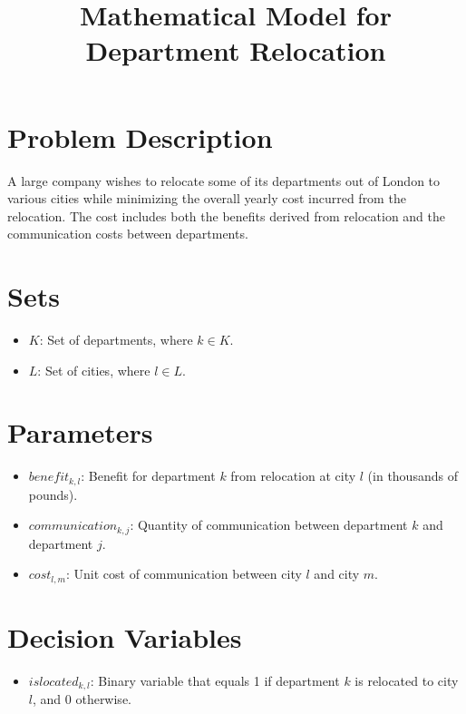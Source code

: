 \documentclass{article}
\begin{document}
\title{Mathematical Model for Department Relocation}
\author{}
\date{}
\maketitle

\section*{Problem Description}

A large company wishes to relocate some of its departments out of London to various cities while minimizing the overall yearly cost incurred from the relocation. The cost includes both the benefits derived from relocation and the communication costs between departments.

\section*{Sets}

\begin{itemize}
    \item $K$: Set of departments, where $k \in K$.
    \item $L$: Set of cities, where $l \in L$.
\end{itemize}

\section*{Parameters}

\begin{itemize}
    \item $benefit_{k, l}$: Benefit for department $k$ from relocation at city $l$ (in thousands of pounds).
    \item $communication_{k, j}$: Quantity of communication between department $k$ and department $j$.
    \item $cost_{l, m}$: Unit cost of communication between city $l$ and city $m$.
\end{itemize}

\section*{Decision Variables}

\begin{itemize}
    \item $islocated_{k, l}$: Binary variable that equals 1 if department $k$ is relocated to city $l$, and 0 otherwise.
\end{itemize}
\end{document}
